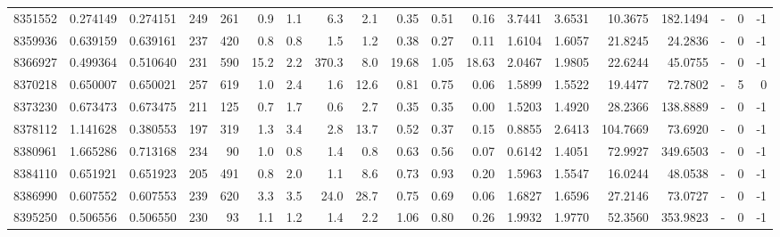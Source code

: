 \begin{tabular}{rrrrrrrrrrrrrrrrlrr}
   8351552 & 0.274149 &   0.274151 &  249 &  261 &      0.9 &      1.1 &     6.3 &      2.1 &       0.35 &        0.51 &        0.16 &  3.7441 &  3.6531 &   10.3675 &  182.1494 &             - &        0 &         -1 \\
   8359936 & 0.639159 &   0.639161 &  237 &  420 &      0.8 &      0.8 &     1.5 &      1.2 &       0.38 &        0.27 &        0.11 &  1.6104 &  1.6057 &   21.8245 &   24.2836 &             - &        0 &         -1 \\
   8366927 & 0.499364 &   0.510640 &  231 &  590 &     15.2 &      2.2 &   370.3 &      8.0 &      19.68 &        1.05 &       18.63 &  2.0467 &  1.9805 &   22.6244 &   45.0755 &             - &        0 &         -1 \\
   8370218 & 0.650007 &   0.650021 &  257 &  619 &      1.0 &      2.4 &     1.6 &     12.6 &       0.81 &        0.75 &        0.06 &  1.5899 &  1.5522 &   19.4477 &   72.7802 &             - &        5 &          0 \\
   8373230 & 0.673473 &   0.673475 &  211 &  125 &      0.7 &      1.7 &     0.6 &      2.7 &       0.35 &        0.35 &        0.00 &  1.5203 &  1.4920 &   28.2366 &  138.8889 &             - &        0 &         -1 \\
   8378112 & 1.141628 &   0.380553 &  197 &  319 &      1.3 &      3.4 &     2.8 &     13.7 &       0.52 &        0.37 &        0.15 &  0.8855 &  2.6413 &  104.7669 &   73.6920 &             - &        0 &         -1 \\
   8380961 & 1.665286 &   0.713168 &  234 &   90 &      1.0 &      0.8 &     1.4 &      0.8 &       0.63 &        0.56 &        0.07 &  0.6142 &  1.4051 &   72.9927 &  349.6503 &             - &        0 &         -1 \\
   8384110 & 0.651921 &   0.651923 &  205 &  491 &      0.8 &      2.0 &     1.1 &      8.6 &       0.73 &        0.93 &        0.20 &  1.5963 &  1.5547 &   16.0244 &   48.0538 &             - &        0 &         -1 \\
   8386990 & 0.607552 &   0.607553 &  239 &  620 &      3.3 &      3.5 &    24.0 &     28.7 &       0.75 &        0.69 &        0.06 &  1.6827 &  1.6596 &   27.2146 &   73.0727 &             - &        0 &         -1 \\
   8395250 & 0.506556 &   0.506550 &  230 &   93 &      1.1 &      1.2 &     1.4 &      2.2 &       1.06 &        0.80 &        0.26 &  1.9932 &  1.9770 &   52.3560 &  353.9823 &             - &        0 &         -1 \\

\end{tabular}
